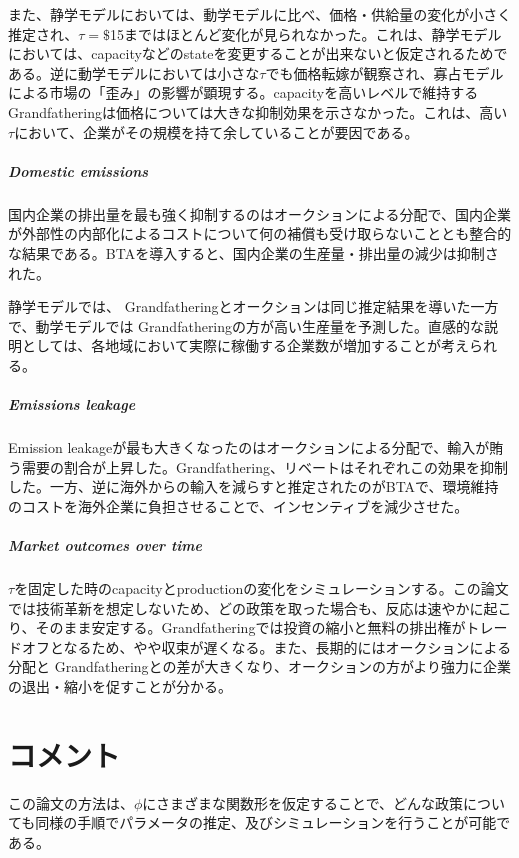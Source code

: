 \documentclass[11pt]{jsarticle}
\begin{document}
また、静学モデルにおいては、動学モデルに比べ、価格・供給量の変化が小さく推定され、$\tau = \$$15まではほとんど変化が見られなかった。これは、静学モデルにおいては、capacityなどのstateを変更することが出来ないと仮定されるためである。逆に動学モデルにおいては小さな$\tau$でも価格転嫁が観察され、寡占モデルによる市場の「歪み」の影響が顕現する。capacityを高いレベルで維持する Grandfatheringは価格については大きな抑制効果を示さなかった。これは、高い$\tau$において、企業がその規模を持て余していることが要因である。

\subparagraph{Domestic emissions}

国内企業の排出量を最も強く抑制するのはオークションによる分配で、国内企業が外部性の内部化によるコストについて何の補償も受け取らないこととも整合的な結果である。BTAを導入すると、国内企業の生産量・排出量の減少は抑制された。

静学モデルでは、 Grandfatheringとオークションは同じ推定結果を導いた一方で、動学モデルでは Grandfatheringの方が高い生産量を予測した。直感的な説明としては、各地域において実際に稼働する企業数が増加することが考えられる。

\subparagraph{Emissions leakage}

Emission leakageが最も大きくなったのはオークションによる分配で、輸入が賄う需要の割合が上昇した。Grandfathering、リベートはそれぞれこの効果を抑制した。一方、逆に海外からの輸入を減らすと推定されたのがBTAで、環境維持のコストを海外企業に負担させることで、インセンティブを減少させた。

\subparagraph{Market outcomes over time}

$\tau$を固定した時のcapacityとproductionの変化をシミュレーションする。この論文では技術革新を想定しないため、どの政策を取った場合も、反応は速やかに起こり、そのまま安定する。Grandfatheringでは投資の縮小と無料の排出権がトレードオフとなるため、やや収束が遅くなる。また、長期的にはオークションによる分配と Grandfatheringとの差が大きくなり、オークションの方がより強力に企業の退出・縮小を促すことが分かる。

\section{コメント}

この論文の方法は、$\phi$にさまざまな関数形を仮定することで、どんな政策についても同様の手順でパラメータの推定、及びシミュレーションを行うことが可能である。
\end{document}
